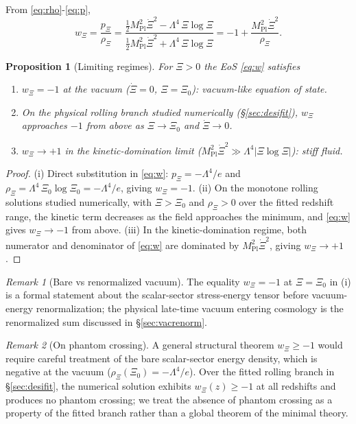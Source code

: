 \documentclass[11pt,reqno]{amsart}
\theoremstyle{plain}
\newtheorem{proposition}[theorem]{Proposition}
\theoremstyle{definition}
\theoremstyle{remark}
\newtheorem*{remark}{Remark}
\newcommand{\Pl}{\mathrm{Pl}}
\begin{document}
From \eqref{eq:rho}-\eqref{eq:p},
\begin{equation}\label{eq:w}
  w_\Xi = \frac{p_\Xi}{\rho_\Xi}
  = \frac{\tfrac{1}{2} M_\Pl^{2}\dot\Xi^{2} - \Lambda^{4}\,\Xi\log\Xi}
         {\tfrac{1}{2} M_\Pl^{2}\dot\Xi^{2} + \Lambda^{4}\,\Xi\log\Xi}
  = -1 + \frac{M_\Pl^{2}\dot\Xi^{2}}{\rho_\Xi}.
\end{equation}

\begin{proposition}[Limiting regimes]\label{prop:limits}
For $\Xi > 0$ the EoS \eqref{eq:w} satisfies
\begin{enumerate}
  \item[(i)] $w_\Xi = -1$ at the vacuum ($\dot\Xi = 0$, $\Xi = \Xi_0$):
        vacuum-like equation of state.
  \item[(ii)] On the physical rolling branch studied numerically
        (\S\ref{sec:desifit}), $w_\Xi$ approaches $-1$ from above as
        $\Xi \to \Xi_0$ and $\dot\Xi \to 0$.
  \item[(iii)] $w_\Xi \to +1$ in the kinetic-domination limit
        ($M_\Pl^{2}\dot\Xi^{2} \gg \Lambda^{4}|\Xi\log\Xi|$): stiff fluid.
\end{enumerate}
\end{proposition}

\begin{proof}
(i) Direct substitution in \eqref{eq:w}: $p_\Xi = -\Lambda^{4}/e$ and
$\rho_\Xi = \Lambda^{4}\,\Xi_0 \log\Xi_0 = -\Lambda^{4}/e$, giving
$w_\Xi = -1$. (ii) On the monotone rolling solutions studied numerically,
with $\Xi > \Xi_0$ and $\rho_\Xi > 0$ over the fitted redshift range, the
kinetic term decreases as the field approaches the minimum, and
\eqref{eq:w} gives $w_\Xi \to -1$ from above.
(iii) In the kinetic-domination regime, both numerator and denominator
of \eqref{eq:w} are dominated by $M_\Pl^{2}\dot\Xi^{2}$, giving
$w_\Xi \to +1$.
\end{proof}

\begin{remark}[Bare vs renormalized vacuum]
The equality $w_\Xi = -1$ at $\Xi = \Xi_0$ in (i) is a formal statement
about the scalar-sector stress-energy tensor before vacuum-energy
renormalization; the physical late-time vacuum entering cosmology is the
renormalized sum discussed in \S\ref{sec:vacrenorm}.
\end{remark}

\begin{remark}[On phantom crossing]
A general structural theorem $w_\Xi \geq -1$ would require careful
treatment of the bare scalar-sector energy density, which is negative
at the vacuum ($\rho_\Xi(\Xi_0) = -\Lambda^4/e$). Over the fitted
rolling branch in \S\ref{sec:desifit}, the numerical solution exhibits
$w_\Xi(z) \geq -1$ at all redshifts and produces no phantom crossing;
we treat the absence of phantom crossing as a property of the fitted
branch rather than a global theorem of the minimal theory.
\end{remark}
\end{document}
